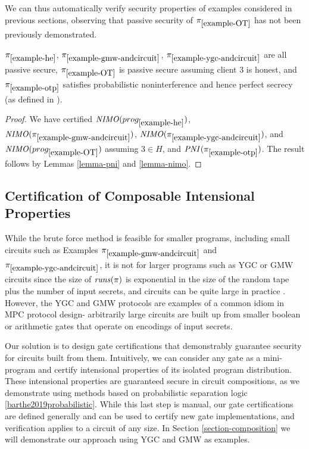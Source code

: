 We can thus automatically verify security properties of examples considered
in previous sections, observing that passive security of $\pi_{\ref{example-OT}}$
has not been previously demonstrated.
\begin{lemma}
  $\pi_{\ref{example-he}}$, $\pi_{\ref{example-gmw-andcircuit}}$,
  $\pi_{\ref{example-ygc-andcircuit}}$ are all passive secure,
  $\pi_{\ref{example-OT}}$ is passive secure assuming client 3 is
  honest, and $\pi_{\ref{example-otp}}$ satisfies probabilistic
  noninterference and hence perfect secrecy (as defined in
  \cite{barthe2019probabilistic}).
\end{lemma}
\begin{proof}
  We have certified $\mathit{NIMO}(prog_{\ref{example-he}})$, $\mathit{NIMO}(\pi_{\ref{example-gmw-andcircuit}})$,
  $\mathit{NIMO}(\pi_{\ref{example-ygc-andcircuit}})$, and $\mathit{NIMO}(prog_{\ref{example-OT}})$ assuming
  $3 \in H$, and $\mathit{PNI}(\pi_{\ref{example-otp}})$. The result follows by Lemmas
  \ref{lemma-pni} and \ref{lemma-nimo}.
\end{proof}

\subsection{Certification of Composable Intensional Properties}
\label{section-automation-intensional}

While the brute force method is feasible for smaller programs,
including small circuits such as Examples
$\pi_{\ref{example-gmw-andcircuit}}$ and
$\pi_{\ref{example-ygc-andcircuit}}$, it is not for larger programs
such as YGC or GMW circuits since the size of $\mathit{runs}(\pi)$ is
exponential in the size of the random tape plus the number of input
secrets, and circuits can be quite large in practice
\cite{kreuter2012billion}.  However, the YGC and GMW protocols are
examples of a common idiom in MPC protocol design- arbitrarily large
circuits are built up from smaller boolean or arithmetic gates that
operate on encodings of input secrets.

Our solution is to design gate certifications that demonstrably
guarantee security for circuits built from them. Intuitively, we can
consider any gate as a mini-program and certify intensional properties
of its isolated program distribution. These intensional properties are
guaranteed secure in circuit compositions, as we demonstrate using
methods based on probabilistic separation logic
\ref{barthe2019probabilistic}. While this last step is manual, our
gate certifications are defined generally and can be used to certify
new gate implementations, and verification applies to a circuit of any
size. In Section \ref{section-composition} we will demonstrate our
approach using YGC and GMW as examples.

